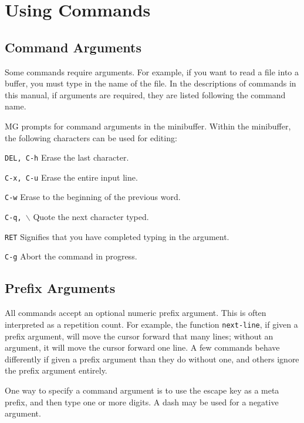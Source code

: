 \chapter{Using Commands}

\section{Command Arguments}

Some commands require arguments.  For example, if you want to read a
file into a buffer, you must type in the name of the file.  In the
descriptions of commands in this manual, if arguments are required,
they are listed following the command name.

MG prompts for command arguments in the minibuffer.  Within the minibuffer,
the following characters can be used for editing:

\begin{define}{\hspace{1in}}
\item[{\tt DEL, C-h}\hfill] Erase the last character. 
\item[{\tt C-x, C-u}\hfill] Erase the entire input line. 
\item[{\tt C-w}\hfill] Erase to the beginning of the previous word. 
\item[{\tt C-q, $\backslash$}\hfill] Quote the next character typed. 
\item[{\tt RET}\hfill] Signifies that you have completed typing in 
the argument. 
\item[{\tt C-g}\hfill] Abort the command in progress.
\end{define}

\section{Prefix Arguments}

All commands accept an optional numeric prefix argument.  This is
often interpreted as a repetition count.  For example, the function
{\tt next-line}, if given a prefix argument, will move the cursor
forward that many lines; without an argument, it will move the cursor
forward one line.  A few commands behave differently if given a prefix
argument than they do without one, and others ignore the prefix
argument entirely. 

\fbody One way to specify a command argument is to use the escape key
as a meta prefix, and then type one or more digits.  A dash may be
used for a negative argument.

